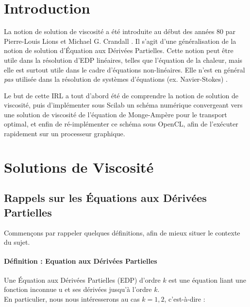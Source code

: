 \documentclass[12pt,a4paper,twoside]{article}
\begin{document}
\newpage

\tableofcontents

\newpage
{}
\setcounter{page}{1}


\section{Introduction}

La notion de solution de viscosité a été introduite au début des années 80 par Pierre-Louis Lions et Michael G. Crandall \cite{crandall1983viscosity}. 
Il s'agit d'une généralisation de la notion de solution d'Équation aux Dérivées Partielles. 
Cette notion peut être utile dans la résolution d'EDP linéaires, telles que l'équation de la chaleur, mais elle est surtout utile dans le cadre d'équations non-linéaires. 
Elle n'est en général \emph{pas} utilisée dans la résolution de systèmes d'équations (ex. Navier-Stokes) \cite{dragoniintroduction}.

Le but de cette IRL a tout d'abord été de comprendre la notion de solution de viscosité, puis d'implémenter sous
Scilab un schéma numérique convergeant vers une solution de viscosité de l'équation de Monge-Ampère pour le transport optimal, et enfin de
ré-implémenter ce schéma sous OpenCL, afin de l'exécuter rapidement sur un processeur graphique.

\section{Solutions de Viscosité}

\subsection{Rappels sur les Équations aux Dérivées Partielles}

Commençons par rappeler quelques définitions, afin de mieux situer le contexte du sujet.

\paragraph*{Définition : Equation aux Dérivées Partielles } 

Une Équation aux Dérivées Partielles (EDP) d'ordre $k$ est une équation liant une fonction inconnue u
et ses dérivées jusqu'à l'ordre $k$. \\

En particulier, nous nous intéresserons au cas $k=1,2$, c'est-à-dire :
\end{document}
